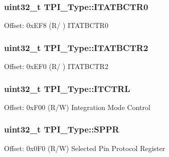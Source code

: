 \subsubsection[{\texorpdfstring{I\+T\+A\+T\+B\+C\+T\+R0}{ITATBCTR0}}]{ uint32\+\_\+t T\+P\+I\+\_\+\+Type\+::\+I\+T\+A\+T\+B\+C\+T\+R0}\hypertarget{structTPI__Type_a20ca7fad4d4009c242f20a7b4a44b7d0}{}\label{structTPI__Type_a20ca7fad4d4009c242f20a7b4a44b7d0}
Offset\+: 0x\+E\+F8 (R/ ) I\+T\+A\+T\+B\+C\+T\+R0 
\subsubsection[{\texorpdfstring{I\+T\+A\+T\+B\+C\+T\+R2}{ITATBCTR2}}]{ uint32\+\_\+t T\+P\+I\+\_\+\+Type\+::\+I\+T\+A\+T\+B\+C\+T\+R2}\hypertarget{structTPI__Type_a176d991adb4c022bd5b982a9f8fa6a1d}{}\label{structTPI__Type_a176d991adb4c022bd5b982a9f8fa6a1d}
Offset\+: 0x\+E\+F0 (R/ ) I\+T\+A\+T\+B\+C\+T\+R2 
\subsubsection[{\texorpdfstring{I\+T\+C\+T\+RL}{ITCTRL}}]{ uint32\+\_\+t T\+P\+I\+\_\+\+Type\+::\+I\+T\+C\+T\+RL}\hypertarget{structTPI__Type_ab49c2cb6b5fe082746a444e07548c198}{}\label{structTPI__Type_ab49c2cb6b5fe082746a444e07548c198}
Offset\+: 0x\+F00 (R/W) Integration Mode Control 
\subsubsection[{\texorpdfstring{S\+P\+PR}{SPPR}}]{ uint32\+\_\+t T\+P\+I\+\_\+\+Type\+::\+S\+P\+PR}\hypertarget{structTPI__Type_a3eb655f2e45d7af358775025c1a50c8e}{}\label{structTPI__Type_a3eb655f2e45d7af358775025c1a50c8e}
Offset\+: 0x0\+F0 (R/W) Selected Pin Protocol Register 
